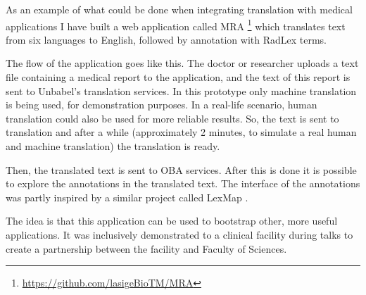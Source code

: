 As an example of what could be done when integrating translation with medical applications I have built a web application called MRA \citep{Campos2017}\footnote{\url{https://github.com/lasigeBioTM/MRA}} which translates text from six languages to English, followed by annotation with RadLex terms. 

The flow of the application goes like this. The doctor or researcher uploads a text file containing a medical report to the application, and the text of this report is sent to Unbabel's translation services. In this prototype only machine translation is being used, for demonstration purposes. In a real-life scenario, human translation could also be used for more reliable results. So, the text is sent to translation and after a while (approximately 2 minutes, to simulate a real human and machine translation) the translation is ready.

Then, the translated text is sent to OBA services. After
this is done it is possible to explore the annotations in the translated text. The interface of the annotations was partly inspired by a similar project called LexMap \citep{Hostetter2015}.

The idea is that this application can be used to bootstrap other, more useful applications. It was inclusively demonstrated to a clinical facility during talks to create a partnership between the facility and Faculty of Sciences.

 
